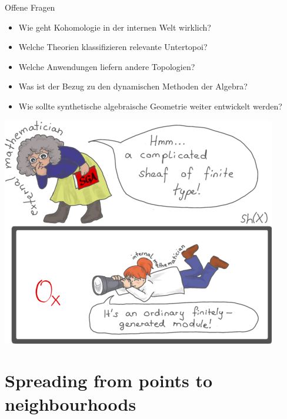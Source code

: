 \documentclass[12pt,utf8,notheorems,compress,t]{beamer}
\renewcommand{\_}{\mathpunct{.}}
\newcommand{\?}{\,{:}\,}
\newcounter{framenumberpreappendix}
\newcommand{\backupstart}{
  \setcounter{framenumberpreappendix}{\value{framenumber}}
}
\begin{document}
\begin{frame}{Offene Fragen}
  \begin{itemize}
    \small
    \item Wie geht Kohomologie in der internen Welt wirklich?
    \item Welche Theorien klassifizieren relevante Untertopoi?
    \item Welche Anwendungen liefern andere Topologien?
    \item Was ist der Bezug zu den dynamischen Methoden der Algebra?
    \item Wie sollte synthetische algebraische Geometrie weiter entwickelt
    werden?
  \end{itemize}

  {\vspace{-0.1em}\centering
  \hspace{-0.05cm}%
  \includegraphics[scale=0.28]{images/external-internal-small}
  \par\medskip\vspace{-0.1em}}
\end{frame}

\backupstart


\appendix


\section{Spreading from points to neighbourhoods}
\end{document}
